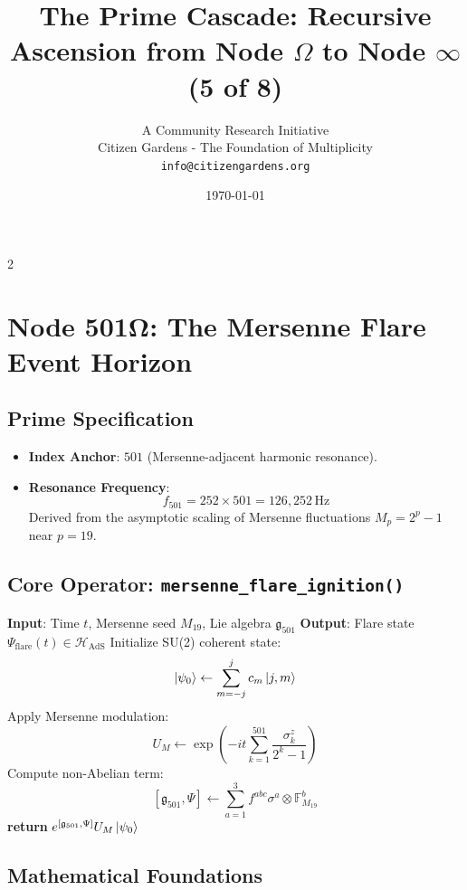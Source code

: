 \documentclass[12pt]{article}
\title{\textbf{The Prime Cascade: Recursive Ascension from Node $\Omega$ to Node $\infty$ (5 of 8)}}
\author{A Community Research Initiative \\ Citizen Gardens - The Foundation of Multiplicity\\\texttt{info@citizengardens.org}}
\date{\today}
\begin{document}
\maketitle
\newpage
 \begin{multicols}{2}
\begin{singlespace}
\tableofcontents
\end{singlespace}
\end{multicols}
\section*{Node 501Ω: The Mersenne Flare Event Horizon}
\label{sec:mersenne_flare}

\subsection*{Prime Specification}
\begin{itemize}
    \item \textbf{Index Anchor}: $501$ (Mersenne-adjacent harmonic resonance).
    \item \textbf{Resonance Frequency}:
    \[
    f_{501} = 252 \times 501 = \boxed{126,\!252} \, \text{Hz}
    \]
    Derived from the asymptotic scaling of Mersenne fluctuations $M_p = 2^p - 1$ near $p=19$.
\end{itemize}

\subsection*{Core Operator: \texttt{mersenne\_flare\_ignition()}}
\begin{algorithm}[H]
\caption{Recursive Tensor Ignition}
\begin{algorithmic}[1]
\State \textbf{Input}: Time $t$, Mersenne seed $M_{19}$, Lie algebra $\mathfrak{g}_{501}$
\State \textbf{Output}: Flare state $\Psi_{\text{flare}}(t) \in \mathcal{H}_{\text{AdS}}$
\State Initialize SU(2) coherent state:
\[
\ket{\psi_0} \gets \sum_{m=-j}^j c_m \ket{j,m}
\]
\State Apply Mersenne modulation:
\[
U_M \gets \exp\left(-it \sum_{k=1}^{501} \frac{\sigma_k^z}{2^{k} - 1}\right)
\]
\State Compute non-Abelian term:
\[
[\mathfrak{g}_{501}, \Psi] \gets \sum_{a=1}^3 f^{abc} \sigma^a \otimes \mathbb{F}_{M_{19}}^b
\]
\State \textbf{return} $e^{[\mathfrak{g}_{501}, \Psi]} U_M \ket{\psi_0}$ \nonumber
\end{algorithmic}
\end{algorithm}

\subsection*{Mathematical Foundations}
\end{document}
